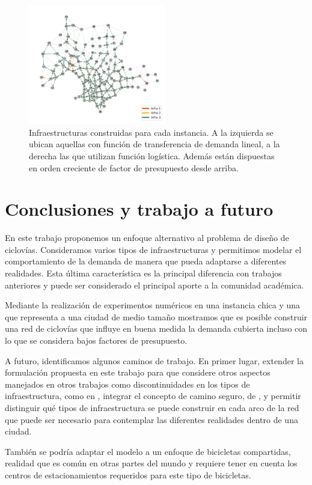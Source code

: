 \documentclass{article}
\begin{document}
\begin{figure}[h!]
    \includegraphics[width=6cm]{../resources/montevideo_d5000.0_inv_logit_1.6_budget_factor.png}
    \caption{Infraestructuras construidas para cada instancia. A la izquierda se ubican aquellas con función de transferencia de demanda lineal, a la derecha las que utilizan función logística. Además están dispuestas en orden creciente de factor de presupuesto desde arriba.}
    \label{fig:montevideo_instances_infras}
  \end{figure}

  \section{Conclusiones y trabajo a futuro}

  En este trabajo proponemos un enfoque alternativo al problema de diseño de ciclovías. Consideramos varios tipos de infraestructuras y permitimos modelar el comportamiento de la demanda de manera que pueda adaptarse a diferentes realidades. Esta última característica es la principal diferencia con trabajos anteriores y puede ser considerado el principal aporte a la comunidad académica.

  Mediante la realización de experimentos numéricos en una instancia chica y una que representa a una ciudad de medio tamaño mostramos que es posible construir una red de ciclovías que influye en buena medida la demanda cubierta incluso con lo que se considera bajos factores de presupuesto.

  A futuro, identificamos algunos caminos de trabajo. En primer lugar, extender la formulación propuesta en este trabajo para que considere otros aspectos manejados en otros trabajos como discontinuidades en los tipos de infraestructura, como en \cite{baya2021}, integrar el concepto de camino seguro, de \cite{lim2021}, y permitir distinguir qué tipos de infraestructura se puede construir en cada arco de la red que puede ser necesario para contemplar las diferentes realidades dentro de una ciudad.

  También se podría adaptar el modelo a un enfoque de bicicletas compartidas, realidad que es común en otras partes del mundo y requiere tener en cuenta los centros de estacionamientos requeridos para este tipo de bicicletas.
\end{document}
